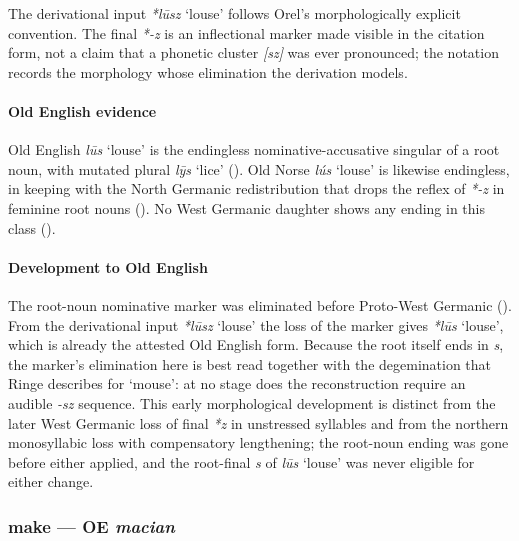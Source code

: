 \documentclass[
  british,
  a4paper,
]{article}
\providecommand{\Recon}[1]{\emph{*#1}}
\begin{document}
The derivational input \Recon{lūsz} `louse' follows Orel's
morphologically explicit convention. The final \emph{*-z} is an
inflectional marker made visible in the citation form, not a claim that
a phonetic cluster \emph{{[}sz{]}} was ever pronounced; the notation
records the morphology whose elimination the derivation models.

\paragraph{Old English evidence}\label{old-english-evidence-48}

Old English {\emph{lūs}} `louse' is the endingless nominative-accusative
singular of a root noun, with mutated plural \emph{lȳs} `lice'
(). Old Norse \emph{lús}
`louse' is likewise endingless, in keeping with the North Germanic
redistribution that drops the reflex of \emph{*-z} in feminine root
nouns (). No West Germanic
daughter shows any ending in this class
().

\paragraph{Development to Old
English}\label{development-to-old-english-47}

The root-noun nominative marker was eliminated before Proto-West
Germanic ().
From the derivational input \Recon{lūsz} `louse' the loss of the marker
gives \Recon{lūs} `louse', which is already the attested Old English
form. Because the root itself ends in \emph{s}, the marker's elimination
here is best read together with the degemination that Ringe describes
for `mouse': at no stage does the reconstruction require an audible
\emph{-sz} sequence. This early morphological development is distinct
from the later West Germanic loss of final \emph{*z} in unstressed
syllables and from the northern monosyllabic loss with compensatory
lengthening; the root-noun ending was gone before either applied, and
the root-final \emph{s} of \emph{lūs} `louse' was never eligible for
either change.

\subsubsection{\texorpdfstring{make --- OE
\emph{macian}}{make --- OE macian}}\label{make-oe-macian}
\end{document}
